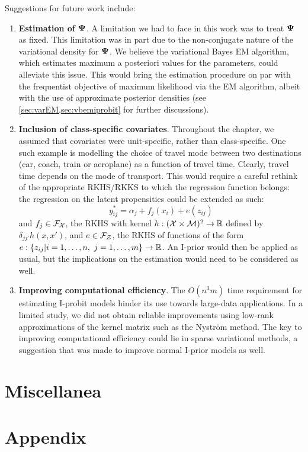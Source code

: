 \documentclass[a4paper,showframe,11pt]{report}
\begin{document}
Suggestions for future work include:
\begin{enumerate}
  \item \textbf{Estimation of ${\bm\Psi}$}. 
  A limitation we had to face in this work was to treat ${\bm\Psi}$ as fixed.
  This limitation was in part due to the non-conjugate nature of the variational density for ${\bm\Psi}$.
  We believe the variational Bayes EM algorithm, which estimates maximum a posteriori values for the parameters, could alleviate this issue.
  This would bring the estimation procedure on par with the frequentist objective of maximum likelihood via the EM algorithm, albeit with the use of approximate posterior densities (see \cref{sec:varEM,sec:vbemiprobit} for further discussions).
  
  \item \textbf{Inclusion of class-specific covariates}. 
  Throughout the chapter, we assumed that covariates were unit-specific, rather than class-specific. 
  One such example is modelling the choice of travel mode between two destinations (car, coach, train or aeroplane) as a function of travel time. 
  Clearly, travel time depends on the mode of transport. 
  This would require a careful rethink of the appropriate RKHS/RKKS to which the regression function belongs: the regression on the latent propensities could be extended as such:
  \[
    y_{ij}^* = \alpha_j + f_j(x_i) + e(z_{ij})
  \]
  and $f_j\in {\mathcal F}_{\mathcal X}$, the RKHS with kernel $h:({\mathcal X} \times {\mathcal M})^2\to\mathbb{R}$ defined by $\delta_{jj'}h(x,x')$, and $e \in {\mathcal F}_{\mathcal Z}$, the RKHS of functions of the form $e:\{z_{ij}|i=1,\dots,n, \ j=1,\dots,m \}\to\mathbb{R}$.
  An I-prior would then be applied as usual, but the implications on the estimation would need to be considered as well.
  
  \item \textbf{Improving computational efficiency}. 
  The $O(n^3m)$ time requirement for estimating I-probit models hinder its use towards large-data applications.
  In a limited study, we did not obtain reliable improvements using low-rank approximations of the kernel matrix such as the Nyström method.
  The key to improving computational efficiency could lie in sparse variational methods, a suggestion that was made to improve normal I-prior models as well.
  
\end{enumerate}


\section{Miscellanea}


\ifstandalone
  \section*{Appendix}
  
  
  
  
\fi

\hClosingStuffStandalone
\end{document}
